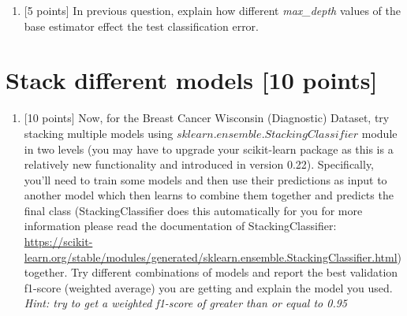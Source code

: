 \documentclass[letterpaper]{article}
\begin{document}
\begin{enumerate}
         
         \item{[5 points]} In previous question, explain how different \textit{max\_depth} values of the base estimator effect the test classification error.
        
         
        
    
    
\end{enumerate}
     
\section{Stack different models [10 points]}

\begin{enumerate}
\item {[10 points]} 
Now, for the Breast Cancer Wisconsin (Diagnostic) Dataset, try stacking multiple models using $sklearn.ensemble.StackingClassifier$ module in two levels (you may have to upgrade your scikit-learn package as this is a relatively new functionality and introduced in version 0.22). Specifically, you'll need to train some models and then use their predictions as input to another model which then learns to combine them together and predicts the final class (StackingClassifier does this automatically for you for more information please read the documentation of StackingClassifier: \url{https://scikit-learn.org/stable/modules/generated/sklearn.ensemble.StackingClassifier.html}) together. Try different combinations of models and report the best validation f1-score (weighted average) you are getting and explain the model you used.\\
\textit{Hint: try to get a weighted f1-score of greater than or equal to 0.95}
\end{enumerate}
\end{document}
